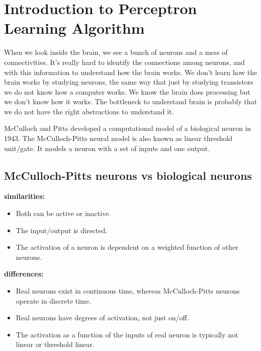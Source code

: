 \documentclass[main]{subfiles}
\begin{document}

\section{Introduction to Perceptron Learning Algorithm}

When we look inside the brain, we see a bunch of neurons and a mess of connectivities.
It's really hard to identify the connections among neurons, and with this information to understand how the brain works.
We don't learn how the brain works by studying neurons, the same way that just by studying transistors we do not know how a computer works.
We know the brain does processing but we don't know how it works.
The bottleneck to understand brain is probably that we do not have the right abstractions to understand it.

McCulloch and Pitts developed a computational model of a biological neuron in 1943.
The McCulloch-Pitts neural model is also known as linear threshold unit/gate.
It models a neuron with a set of inputs and one output.

\subsection{McCulloch-Pitts neurons vs biological neurons}
\textbf{similarities:}
\begin{itemize}[noitemsep,nolistsep]
	\item Both can be active or inactive.
	\item The input/output is directed.
	\item The activation of a neuron is dependent on a weighted function of other neurons.
\end{itemize}
\textbf{differences:}
\begin{itemize}[noitemsep,nolistsep]
	\item Real neurons exist in continuous time, whereas McCulloch-Pitts neurons operate in discrete time.
	\item Real neurons have degrees of activation, not just on/off.
	\item The activation as a function of the inputs of real neuron is typically not linear or threshold linear.
\end{itemize}
\end{document}
